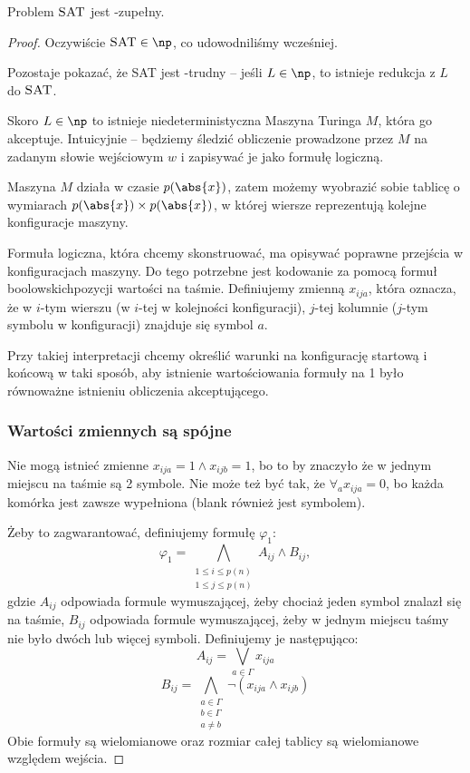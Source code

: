 \begin{theorem}
    Problem \( \textsc{SAT} \) jest \np-zupełny.
\end{theorem}
\begin{proof}
    Oczywiście \( \textsc{SAT} \in \np \), co udowodniliśmy wcześniej.
    
    Pozostaje pokazać, że \textsc{SAT} jest \np-trudny -- jeśli \( L \in \np \), to istnieje redukcja z \( L \) do \( \textsc{SAT} \).
    
    Skoro \( L \in \np \) to istnieje niedeterministyczna Maszyna Turinga \( M \), która go akceptuje. Intuicyjnie -- będziemy śledzić obliczenie prowadzone przez \( M \) na zadanym słowie wejściowym \( w \) i zapisywać je jako formułę logiczną.
    
    Maszyna \( M \) działa w czasie \( p(\abs{x}) \), zatem możemy wyobrazić sobie tablicę o wymiarach \( p(\abs{x}) \times p(\abs{x}) \), w której wiersze reprezentują kolejne konfiguracje maszyny.

    Formuła logiczna, która chcemy skonstruować, ma opisywać poprawne przejścia w konfiguracjach maszyny.
    Do tego potrzebne jest kodowanie za pomocą formuł boolowskichpozycji wartości na taśmie.
    Definiujemy zmienną \( x_{ija} \), która oznacza, że w \(i\)-tym wierszu (w \(i\)-tej w kolejności konfiguracji), \(j\)-tej kolumnie (\(j\)-tym symbolu w konfiguracji) znajduje się symbol \(a\). 
    
    Przy takiej interpretacji chcemy określić warunki na konfigurację startową i końcową w taki sposób, aby istnienie wartościowania formuły na 1 było równoważne istnieniu obliczenia akceptującego.
    
    \subsubsection{Wartości zmiennych są spójne}
        Nie mogą istnieć zmienne \(x_{ija} = 1 \land x_{ijb} = 1\), bo to by znaczyło że w jednym miejscu na taśmie są 2 symbole.
        Nie może też być tak, że \( \forall_a x_{ija} = 0\), bo każda komórka jest zawsze wypełniona (blank również jest symbolem).
    
        Żeby to zagwarantować, definiujemy formułę \(\varphi_1\): 
        \[ 
            \varphi_1 = \bigwedge_{\substack{1 \leq i \leq p(n) \\ 1 \leq j \leq p(n)}} A_{ij} \land B_{ij} , 
        \]
        gdzie \(A_{ij}\) odpowiada formule wymuszającej, żeby chociaż jeden symbol znalazł się na taśmie, \(B_{ij}\) odpowiada formule wymuszającej, żeby w jednym miejscu taśmy nie było dwóch lub więcej symboli. Definiujemy je następująco:  
        \[ 
            A_{ij} = \bigvee_{a \in \Gamma} x_{ija}
        \]        
        \[
            B_{ij} = \bigwedge_{\substack{a\in\Gamma \\ b\in\Gamma \\ a \not = b}} \neg(x_{ija} \land x_{ijb})
        \]
        Obie formuły są wielomianowe oraz rozmiar całej tablicy są wielomianowe względem wejścia. 
    

\end{proof}

